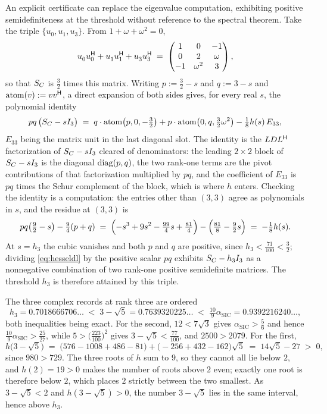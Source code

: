 An explicit certificate can replace the eigenvalue computation,
exhibiting positive semidefiniteness at the threshold without reference
to the spectral theorem.  Take the triple $\{u_0,u_1,u_3\}$.
From $1+\omega+\omega^{2}=0$,
\[
  u_0^{\vphantom{\mathsf{H}}}u_0\adj+u_1^{\vphantom{\mathsf{H}}}u_1\adj
  +u_3^{\vphantom{\mathsf{H}}}u_3\adj
  \;=\;\begin{pmatrix}1&0&-1\\0&2&\omega\\-1&\omega^{2}&3\end{pmatrix},
\]
so that $S_{C}$ is $\tfrac32$ times this matrix.  Writing
$p:=\tfrac32-s$ and $q:=3-s$ and $\operatorname{atom}(v):=vv^{\mathsf{H}}$, a
direct expansion of both sides gives, for every real $s$, the polynomial
identity
\begin{equation}\label{eq:hesseldl}
  pq\,\bigl(S_{C}-sI_3\bigr)
  \;=\;q\cdot\operatorname{atom}\bigl(p,0,-\tfrac32\bigr)
      +p\cdot\operatorname{atom}\bigl(0,q,\tfrac32\omega^{2}\bigr)
      -\tfrac18h(s)\,E_{33},
\end{equation}
$E_{33}$ being the matrix unit in the last diagonal slot.  The identity is
the $LDL^{\mathsf{H}}$ factorization of $S_{C}-sI_3$ cleared of denominators: the
leading $2\times2$ block of $S_{C}-sI_3$ is the diagonal $\operatorname{diag}(p,q)$, the
two rank-one terms are the pivot contributions of that factorization
multiplied by $pq$, and the coefficient of $E_{33}$ is $pq$ times the
Schur complement of the block, which is where $h$ enters.  Checking the
identity is a computation: the entries other than $(3,3)$ agree as
polynomials in $s$, and the residue at $(3,3)$ is
\[
  pq\bigl(\tfrac92-s\bigr)-\tfrac94(p+q)
  \;=\;\Bigl(-s^{3}+9s^{2}-\tfrac{99}4s+\tfrac{81}4\Bigr)
        -\Bigl(\tfrac{81}8-\tfrac92 s\Bigr)
  \;=\;-\tfrac18h(s).
\]
At $s=h_3$ the cubic vanishes and both $p$ and $q$ are positive, since
$h_3<\tfrac{71}{100}<\tfrac32$; dividing \eqref{eq:hesseldl} by the
positive scalar $pq$ exhibits $S_{C}-h_3I_3$ as a nonnegative combination of
two rank-one positive semidefinite matrices.  The threshold $h_3$ is
therefore attained by this triple.

The three complex records at rank three are ordered
\[
  h_3=0.7018666706\ldots
  \;<\;3-\sqrt5=0.7639320225\ldots
  \;<\;\tfrac{10}9\alpha_{\mathrm{SIC}}=0.9392216240\ldots ,
\]
both inequalities being exact.  For the second, $12<7\sqrt3$ gives
$\alpha_{\mathrm{SIC}}>\tfrac56$ and hence $\tfrac{10}9\alpha_{\mathrm{SIC}}>\tfrac{25}{27}$, while
$5>\bigl(\tfrac{223}{100}\bigr)^{2}$ gives $3-\sqrt5<\tfrac{77}{100}$, and
$2500>2079$.  For the first,
\[
  h\bigl(3-\sqrt5\bigr)\;=\;\bigl(576-1008+486-81\bigr)
   +\bigl(-256+432-162\bigr)\sqrt5\;=\;14\sqrt5-27\;>\;0,
\]
since $980>729$.  The three roots of $h$ sum to $9$, so they cannot all
lie below $2$, and $h(2)=19>0$ makes the number of roots above $2$ even;
exactly one root is therefore below $2$, which places $2$ strictly
between the two smallest.  As $3-\sqrt5<2$ and $h(3-\sqrt5)>0$, the
number $3-\sqrt5$ lies in the same interval, hence above $h_3$.

